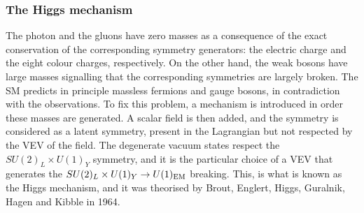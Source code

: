 



\subsubsection{The Higgs mechanism}

The photon and the gluons have zero masses as a consequence of the exact conservation of the corresponding symmetry generators: the electric charge and the eight colour charges, respectively. On the other hand, the weak bosons have large masses signalling that the corresponding symmetries are largely broken. The \ac{SM} predicts in principle massless fermions and gauge bosons, in contradiction with the observations.
To fix this problem, a mechanism is introduced in order these masses are generated. A scalar field is then added, and the symmetry is considered as a latent symmetry, present in the Lagrangian but not respected by the \ac{VEV} of the field. The degenerate vacuum states respect the \(SU(2)_L \times U(1)_Y\) symmetry, and it is the particular choice of a \ac{VEV} that generates the \(SU(2)_L \times U(1)_Y \rightarrow U(1)_{\text{EM}}\) breaking. This, is what is known as the Higgs mechanism, and it was theorised by Brout, Englert, Higgs, Guralnik, Hagen and Kibble in 1964.




